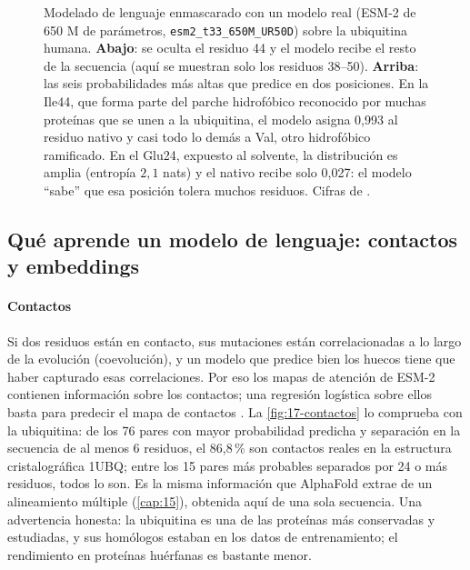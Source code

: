 \begin{figure}[!tbp]
\caption[Modelado de lenguaje enmascarado con ESM-2]{Modelado de lenguaje enmascarado con un modelo real (ESM-2 de 650 M de parámetros, \texttt{esm2\_t33\_650M\_UR50D}) sobre la ubiquitina humana. \textbf{Abajo}: se oculta el residuo 44 y el modelo recibe el resto de la secuencia (aquí se muestran solo los residuos 38--50). \textbf{Arriba}: las seis probabilidades más altas que predice en dos posiciones. En la Ile44, que forma parte del parche hidrofóbico reconocido por muchas proteínas que se unen a la ubiquitina, el modelo asigna 0,993 al residuo nativo y casi todo lo demás a Val, otro hidrofóbico ramificado. En el Glu24, expuesto al solvente, la distribución es amplia (entropía $2{,}1$ nats) y el nativo recibe solo 0,027: el modelo ``sabe'' que esa posición tolera muchos residuos. Cifras de .}
\label{fig:17-mlm}
\end{figure}

\subsection{Qué aprende un modelo de lenguaje: contactos y embeddings}

\paragraph{Contactos} Si dos residuos están en contacto, sus mutaciones están correlacionadas a lo largo de la evolución (coevolución), y un modelo que predice bien los huecos tiene que haber capturado esas correlaciones. Por eso los mapas de atención de ESM-2 contienen información sobre los contactos; una regresión logística sobre ellos basta para predecir el mapa de contactos \parencite{c17-lin2023}. La \cref{fig:17-contactos} lo comprueba con la ubiquitina: de los 76 pares con mayor probabilidad predicha y separación en la secuencia de al menos 6 residuos, el 86,8\,\% son contactos reales en la estructura cristalográfica 1UBQ; entre los 15 pares más probables separados por 24 o más residuos, todos lo son. Es la misma información que AlphaFold \parencite{c17-jumper2021} extrae de un alineamiento múltiple (\cref{cap:15}), obtenida aquí de una sola secuencia. Una advertencia honesta: la ubiquitina es una de las proteínas más conservadas y estudiadas, y sus homólogos estaban en los datos de entrenamiento; el rendimiento en proteínas huérfanas es bastante menor.

